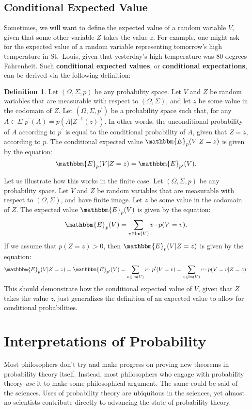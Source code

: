 \documentclass[11pt]{article}
\theoremstyle{definition}
\newtheorem{definition}[theorem]{Definition}
\theoremstyle{remark}
\begin{document}
\subsection{Conditional Expected Value}
Sometimes, we will want to define the expected value of a random variable $V$, given that some other variable $Z$ takes the value $z$. For example, one might ask for the expected value of a random variable representing tomorrow's high temperature in St.\ Louis, given that yesterday's high temperature was $80$ degrees Fahrenheit. Such \textbf{conditional expected values}, or \textbf{conditional expectations}, can be derived via the following definition:
\begin{definition}
    Let $(\Omega,\Sigma,p)$ be any probability space. Let $V$ and $Z$ be random variables that are measurable with respect to $(\Omega,\Sigma)$, and let $z$ be some value in the codomain of $Z$. Let $(\Omega,\Sigma,p^{\prime})$ be a probability space such that, for any $A\in\Sigma$ $p^{\prime}(A)=p(A|Z^{-1}(z))$. In other words, the unconditional probability of $A$ according to $p^{\prime}$ is equal to the conditional probability of $A$, given that $Z=z$, according to $p$. The conditional expected value $\mathbbm{E}_{p}(V|Z=z)$ is given by the equation:
    $$\mathbbm{E}_{p}(V|Z=z)=\mathbbm{E}_{p^{\prime}}(V).$$
\end{definition}
\noindent
Let us illustrate how this works in the finite case. Let $(\Omega,\Sigma,p)$ be any probability space. Let $V$ and $Z$ be random variables that are measurable with respect to $(\Omega,\Sigma)$, and have finite image. Let $z$ be some value in the codomain of $Z$. The expected value $\mathbbm{E}_{p}(V)$ is given by the equation:
$$\mathbbm{E}_{p}(V)=\sum_{v\in\textsf{Im}(V)}v\cdot p(V=v).$$
If we assume that $p(Z=z)>0$, then $\mathbbm{E}_{p}(V|Z=z)$ is given by the equation:
$$\mathbbm{E}_{p}(V|Z=z)=\mathbbm{E}_{p^{\prime}}(V)=\sum_{v\in\textsf{Im}(V)}v\cdot p^{\prime}(V=v)=\sum_{v\in\textsf{Im}(V)}v\cdot p(V=v|Z=z).$$
This should demonstrate how the conditional expected value of $V$, given that $Z$ takes the value $z$, just generalizes the definition of an expected value to allow for conditional probabilities.\par 


\section{Interpretations of Probability}
Most philosophers don't try and make progress on proving new theorems in probability theory itself. Instead, most philosophers who engage with probability theory \textit{use} it to make some philosophical argument. The same could be said of the sciences. Uses of probability theory are ubiquitous in the sciences, yet almost no scientists contribute directly to advancing the state of probability theory.\par 
\end{document}
